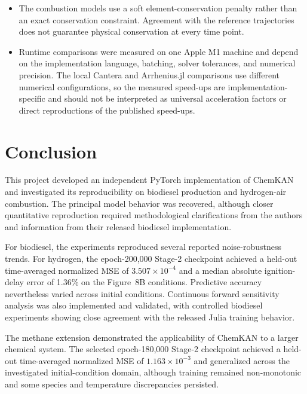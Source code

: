 \documentclass[11pt,a4paper]{article}
\begin{document}
\begin{itemize}
    results assess generalization to unseen
    initial-condition combinations but do not
    establish extrapolation beyond those ranges.
    \item The combustion models use a soft
    element-conservation penalty rather than an
    exact conservation constraint. Agreement with
    the reference trajectories does not guarantee
    physical conservation at every time point. 
    \item Runtime comparisons were measured on one
    Apple M1 machine and depend on the implementation
    language, batching, solver tolerances, and numerical
    precision. The local Cantera and Arrhenius.jl
    comparisons use different numerical configurations,
    so the measured speed-ups are implementation-specific
    and should not be interpreted as universal acceleration
    factors or direct reproductions of the published
    speed-ups.
\end{itemize}


\section{Conclusion}

This project developed an independent PyTorch
implementation of ChemKAN and investigated
its reproducibility on biodiesel production
and hydrogen-air combustion. The principal
model behavior was recovered, although closer
quantitative reproduction required methodological
clarifications from the authors and information
from their released biodiesel implementation.

For biodiesel, the experiments reproduced
several reported noise-robustness trends.
For hydrogen, the epoch-200,000 Stage-2 checkpoint
achieved a held-out time-averaged normalized
MSE of $3.507\times10^{-4}$ and a median
absolute ignition-delay error of 1.36\%
on the Figure~8B conditions. Predictive
accuracy nevertheless varied across
initial conditions. Continuous forward
sensitivity analysis was also implemented
and validated, with controlled biodiesel
experiments showing close agreement with
the released Julia training behavior.

The methane extension demonstrated the
applicability of ChemKAN to a larger
chemical system. The selected epoch-180,000
Stage-2 checkpoint achieved a held-out
time-averaged normalized MSE of
$1.163\times10^{-3}$ and generalized
across the investigated initial-condition
domain, although training remained
non-monotonic and some species and
temperature discrepancies persisted.
\end{document}
